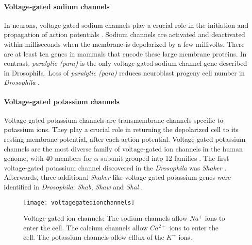 \paragraph{Voltage-gated sodium channels}
In neurons, voltage-gated sodium channels play a crucial role in the initiation and propagation of action potentials \parencite{Hodgkin1952}. Sodium channels are activated and deactivated within milliseconds when the membrane is depolarized by a few millivolts. There are at least ten genes in mammals that encode these large membrane proteins. In contrast, \textit{paralytic (para)} is the only voltage-gated sodium channel gene described in Drosophila. Loss of \textit{paralytic (para)} reduces neuroblast progeny cell number in \textit{Drosophila} \parencite{Piggott2019}.

\paragraph{Voltage-gated potassium channels}
Voltage-gated potassium channels are transmembrane channels specific to potassium ions. They play a crucial role in returning the depolarized cell to its resting membrane potential, after each action potential. Voltage-gated potassium channels are the most diverse family of voltage-gated ion channels in the human genome, with 40 members for $\alpha$ subunit grouped into 12 families \parencite{Gutman2005}. The first voltage-gated potassium channel discovered in the \textit{Drosophila} was \textit{Shaker} \parencite{Papazian1987}. Afterwards, three additional \textit{Shaker} like voltage-gated potassium genes were identified in \textit{Drosophila}: \textit{Shab}, \textit{Shaw} and \textit{Shal} \parencite{Covarrubias1991}. 

\begin{figure}
\centering
\hspace*{-1cm} 
\texttt{[image: voltagegatedionchannels]}
\caption[Voltage-gated ion channels] {Voltage-gated ion channels: The sodium channels allow $Na^{+}$ ions to enter the cell. The calcium channels allow $Ca^{2+}$ ions to enter the cell. The potassium channels allow efflux of the $K^{+}$ ions.}
\label{fig:vgatedionc}
\end{figure}


